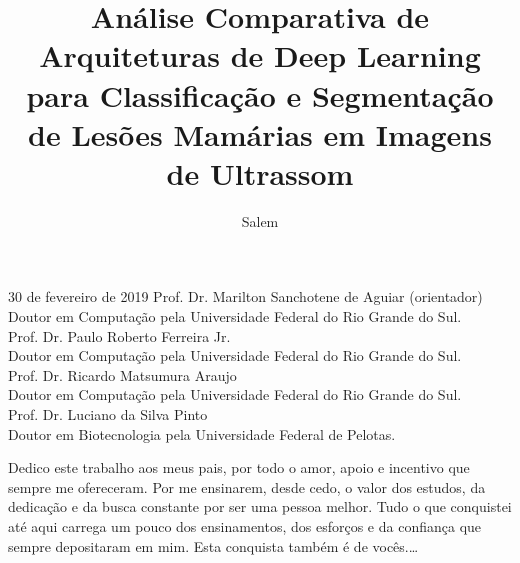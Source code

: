 \documentclass[tcc,capa]{texufpel}
\title{Análise Comparativa de Arquiteturas de Deep Learning para Classificação e Segmentação de Lesões Mamárias em Imagens de Ultrassom}
\author{Salem}{Murilo}
\begin{document}

\maketitle 

\sloppy

\fichacatalografica


\begin{aprovacao}{30 de fevereiro de 2019} %
\noindent Prof. Dr. Marilton Sanchotene de Aguiar (orientador)\\
Doutor em Computação pela Universidade Federal do Rio Grande do Sul.\\[1cm]

\noindent Prof. Dr. Paulo Roberto Ferreira Jr.\\
Doutor em Computação pela Universidade Federal do Rio Grande do Sul.\\[1cm]

\noindent Prof. Dr. Ricardo Matsumura Araujo\\
Doutor em Computação pela Universidade Federal do Rio Grande do Sul.\\[1cm]

\noindent Prof. Dr. Luciano da Silva Pinto\\
Doutor em Biotecnologia pela Universidade Federal de Pelotas.
\end{aprovacao}

\begin{dedicatoria}
  Dedico este trabalho aos meus pais, por todo o amor, apoio e incentivo que sempre me ofereceram. Por me ensinarem, desde cedo, o valor dos estudos, da dedicação e da busca constante por ser uma pessoa melhor. Tudo o que conquistei até aqui carrega um pouco dos ensinamentos, dos esforços e da confiança que sempre depositaram em mim. Esta conquista também é de vocês.\ldots 
\end{dedicatoria}
\end{document}

